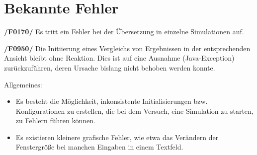 \section{Bekannte Fehler}

\textbf{/F0170/}
Es tritt ein Fehler bei der Übersetzung in einzelne Simulationen auf.

\textbf{/F0950/}
Die Initiierung eines Vergleichs von Ergebnissen in der entsprechenden Ansicht bleibt ohne Reaktion. Dies ist auf eine Ausnahme (Java-Exception) zurückzuführen, deren Ursache bislang nicht behoben werden konnte.

Allgemeines:
\begin{itemize}
\item Es besteht die Möglichkeit, inkonsistente Initialisierungen bzw. Konfigurationen zu erstellen, die bei dem Versuch, eine Simulation zu starten, zu Fehlern führen können.

\item Es existieren kleinere grafische Fehler, wie etwa das Verändern der Fenstergröße bei manchen Eingaben in einem Textfeld.
\end{itemize}